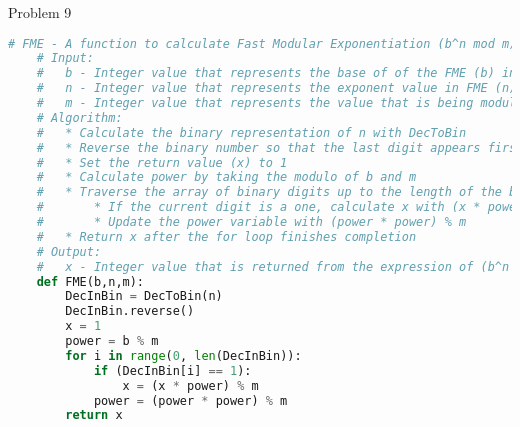 \begin{problem}{Problem 9}
\begin{Highlight}[Solution]
\begin{lstlisting}[style=stackoverflow, language=python]
    # FME - A function to calculate Fast Modular Exponentiation (b^n mod m)
    # Input:
    #   b - Integer value that represents the base of of the FME (b) in (b^n mod m)
    #   n - Integer value that represents the exponent value in FME (n) in (b^n mod m)
    #   m - Integer value that represents the value that is being modulod against in FME (m) in (b^n mod m)
    # Algorithm:
    #   * Calculate the binary representation of n with DecToBin
    #   * Reverse the binary number so that the last digit appears first in the array
    #   * Set the return value (x) to 1
    #   * Calculate power by taking the modulo of b and m
    #   * Traverse the array of binary digits up to the length of the binary number
    #       * If the current digit is a one, calculate x with (x * power) % m
    #       * Update the power variable with (power * power) % m
    #   * Return x after the for loop finishes completion
    # Output:
    #   x - Integer value that is returned from the expression of (b^n mod m)
    def FME(b,n,m):
        DecInBin = DecToBin(n)
        DecInBin.reverse()
        x = 1
        power = b % m
        for i in range(0, len(DecInBin)):
            if (DecInBin[i] == 1):
                x = (x * power) % m
            power = (power * power) % m
        return x
    \end{lstlisting}
    \end{Highlight}
\end{problem}

